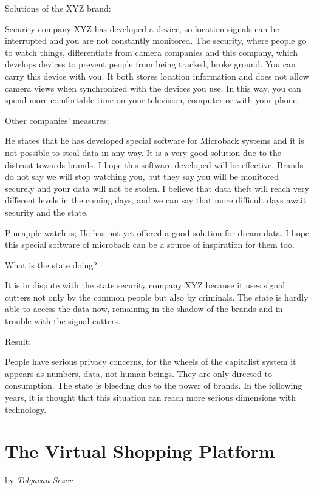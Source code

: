 \documentclass[]{book}
\begin{document}
Solutions of the XYZ brand:

Security company XYZ has developed a device, so location signals can be interrupted and you are not constantly monitored. The security, where people go to watch things, differentiate from camera companies and this company, which develops devices to prevent people from being tracked, broke ground. You can carry this device with you. It both stores location information and does not allow camera views when synchronized with the devices you use. In this way, you can spend more comfortable time on your television, computer or with your phone.

Other companies' measures:

He states that he has developed special software for Microback systems and it is not possible to steal data in any way. It is a very good solution due to the distrust towards brands. I hope this software developed will be effective. Brands do not say we will stop watching you, but they say you will be monitored securely and your data will not be stolen. I believe that data theft will reach very different levels in the coming days, and we can say that more difficult days await security and the state.

Pineapple watch is; He has not yet offered a good solution for dream data. I hope this special software of microback can be a source of inspiration for them too.

What is the state doing?

It is in dispute with the state security company XYZ because it uses signal cutters not only by the common people but also by criminals. The state is hardly able to access the data now, remaining in the shadow of the brands and in trouble with the signal cutters.

Result:

People have serious privacy concerns, for the wheels of the capitalist system it appears as numbers, data, not human beings. They are only directed to consumption. The state is bleeding due to the power of brands. In the following years, it is thought that this situation can reach more serious dimensions with technology.

\hypertarget{the-virtual-shopping-platform}{%
\chapter{The Virtual Shopping Platform}\label{the-virtual-shopping-platform}}

by \emph{Tolgacan Sezer}
\end{document}
